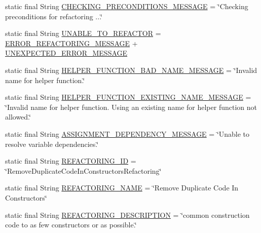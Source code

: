 \begin{DoxyCompactItemize}
\item 
static final String \hyperlink{classedu_1_1illinois_1_1canistelCassabanana_1_1RemoveDuplicateCodeInConstructorsConstants_af08e2ca4fcb3b7e1dd047b88a278d125}{CHECKING\_\-PRECONDITIONS\_\-MESSAGE} = \char`\"{}Checking preconditions for refactoring ...\char`\"{}
\item 
static final String \hyperlink{classedu_1_1illinois_1_1canistelCassabanana_1_1RemoveDuplicateCodeInConstructorsConstants_af6677744b84dd45adf12fd7b89ed48ac}{UNABLE\_\-TO\_\-REFACTOR} = \hyperlink{classedu_1_1illinois_1_1canistelCassabanana_1_1RemoveDuplicateCodeInConstructorsConstants_a2c16519d26ea44a059eb7c581ffba184}{ERROR\_\-REFACTORING\_\-MESSAGE} + \hyperlink{classedu_1_1illinois_1_1canistelCassabanana_1_1RemoveDuplicateCodeInConstructorsConstants_a7a26202b57ca9d8cec6eff644aa32b0e}{UNEXPECTED\_\-ERROR\_\-MESSAGE}
\item 
static final String \hyperlink{classedu_1_1illinois_1_1canistelCassabanana_1_1RemoveDuplicateCodeInConstructorsConstants_afa4feca83076400e818b7bf986ec0cba}{HELPER\_\-FUNCTION\_\-BAD\_\-NAME\_\-MESSAGE} = \char`\"{}Invalid name for helper function.\char`\"{}
\item 
static final String \hyperlink{classedu_1_1illinois_1_1canistelCassabanana_1_1RemoveDuplicateCodeInConstructorsConstants_a73f78b335cd908fb2db82107e224666a}{HELPER\_\-FUNCTION\_\-EXISTING\_\-NAME\_\-MESSAGE} = \char`\"{}Invalid name for helper function. Using an existing name for helper function not allowed.\char`\"{}
\item 
static final String \hyperlink{classedu_1_1illinois_1_1canistelCassabanana_1_1RemoveDuplicateCodeInConstructorsConstants_af88d743c439c0f350deee3b7a8589bdc}{ASSIGNMENT\_\-DEPENDENCY\_\-MESSAGE} = \char`\"{}Unable to resolve variable dependencies.\char`\"{}
\item 
static final String \hyperlink{classedu_1_1illinois_1_1canistelCassabanana_1_1RemoveDuplicateCodeInConstructorsConstants_a9ec775251440faa08c5106486ba0cfee}{REFACTORING\_\-ID} = \char`\"{}RemoveDuplicateCodeInConstructorsRefactoring\char`\"{}
\item 
static final String \hyperlink{classedu_1_1illinois_1_1canistelCassabanana_1_1RemoveDuplicateCodeInConstructorsConstants_a6731b6d50436db4f3f9a0ecb1ba760fe}{REFACTORING\_\-NAME} = \char`\"{}Remove Duplicate Code In Constructors\char`\"{}
\item 
static final String \hyperlink{classedu_1_1illinois_1_1canistelCassabanana_1_1RemoveDuplicateCodeInConstructorsConstants_abc82ec73939a90527fd8d564f097cef2}{REFACTORING\_\-DESCRIPTION} = \char`\"{}common construction code to as few constructors or as possible.\char`\"{}
\end{DoxyCompactItemize}


